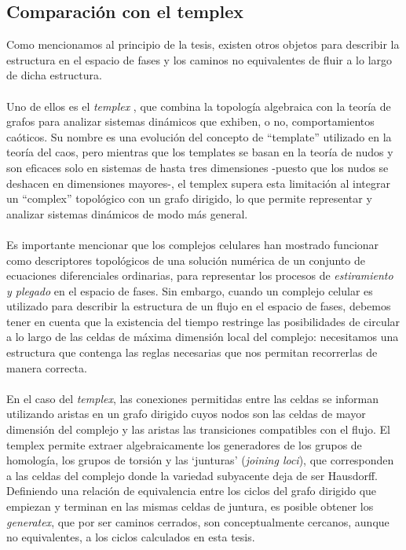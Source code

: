\documentclass[12pt,a4paper]{article}
\begin{document}
\subsection{Comparación con el templex}
Como mencionamos al principio de la tesis, existen otros objetos para describir la estructura en el espacio de fases y los caminos no equivalentes de fluir a lo largo de dicha estructura.
\\
\\
Uno de ellos es el \textit{templex} \cite{templex-paperchaos,templex-chapterpablo}, que combina la topología algebraica con la teoría de grafos para analizar sistemas dinámicos que exhiben, o no, comportamientos caóticos. Su nombre es una evolución del concepto de ``template'' utilizado en la teoría del caos, pero mientras que los templates se basan en la teoría de nudos y son eficaces solo en sistemas de hasta tres dimensiones -puesto que los nudos se deshacen en dimensiones mayores-, el templex supera esta limitación al integrar un ``complex'' topológico con un grafo dirigido, lo que permite representar y analizar sistemas dinámicos de modo más general.
\\
\\
Es importante mencionar que los complejos celulares han mostrado funcionar como descriptores topológicos de una solución numérica de un conjunto de ecuaciones diferenciales ordinarias, para representar  los procesos de \textit{estiramiento y plegado} en el espacio de fases. Sin embargo, cuando un complejo celular es utilizado para describir la estructura de un flujo en el espacio de fases, debemos tener en cuenta que la existencia del tiempo restringe las posibilidades de circular a lo largo de las celdas de máxima dimensión local del complejo: necesitamos una estructura que contenga las reglas necesarias que nos permitan recorrerlas de manera correcta. 
\\
\\
En el caso del \textit{templex}, las conexiones permitidas entre las celdas se informan utilizando aristas en un grafo dirigido cuyos nodos son las celdas de mayor dimensión del complejo y las aristas las transiciones compatibles con el flujo. 
El templex permite extraer algebraicamente los generadores de los grupos de homología, los grupos de torsión y las `junturas' (\textit{joining loci}), que corresponden a las celdas del complejo donde la variedad subyacente deja de ser Hausdorff. Definiendo una relación de equivalencia entre los ciclos del grafo dirigido que empiezan y terminan en las mismas celdas de juntura, es posible obtener los \textit{generatex}, que por ser caminos cerrados, son conceptualmente cercanos, aunque no equivalentes, a los ciclos calculados en esta tesis. 
\end{document}
